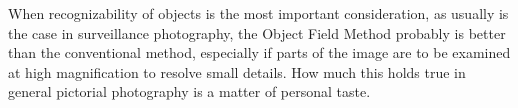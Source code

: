 \documentclass[11pt, oneside]{scrartcl}   	%
\begin{document}
When recognizability of objects is the most important consideration, as usually is the case in surveillance photography, the Object Field Method probably is better than the conventional method, especially if parts of the image are to be examined at high magnification to resolve small details. How much this holds true in general pictorial photography is a matter of personal taste.
\end{document}

